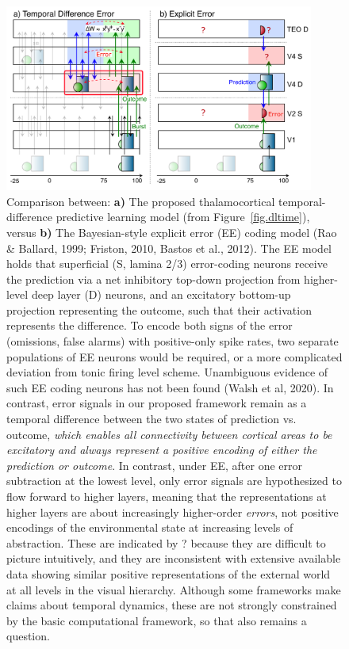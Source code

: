 \documentclass[11pt,twoside]{article}
\newif\myifpdf
\begin{document}
\begin{figure}
  \centering\includegraphics[width=4in]{fig_deepleabra_vs_expliciterr}
  \caption{\footnotesize Comparison between: {\bf a)} The proposed thalamocortical temporal-difference predictive learning model (from Figure~\ref{fig.dltime}), versus {\bf b)} The Bayesian-style explicit error (EE) coding model (Rao \& Ballard, 1999; Friston, 2010, Bastos et al., 2012).  The EE model holds that superficial (S, lamina 2/3) error-coding neurons receive the prediction via a net inhibitory top-down projection from higher-level deep layer (D) neurons, and an excitatory bottom-up projection representing the outcome, such that their activation represents the difference.  To encode both signs of the error (omissions, false alarms) with positive-only spike rates, two separate populations of EE neurons would be required, or a more complicated deviation from tonic firing level scheme.  Unambiguous evidence of such EE coding neurons has not been found (Walsh et al, 2020).  In contrast, error signals in our proposed framework remain as a temporal difference between the two states of prediction vs. outcome, \emph{which enables all connectivity between cortical areas to be excitatory and always represent a positive encoding of either the prediction or outcome}.  In contrast, under EE, after one error subtraction at the lowest level, only error signals are hypothesized to flow forward to higher layers, meaning that the representations at higher layers are about increasingly higher-order \emph{errors}, not positive encodings of the environmental state at increasing levels of abstraction.  These are indicated by ? because they are difficult to picture intuitively, and they are inconsistent with extensive available data showing similar positive representations of the external world at all levels in the visual hierarchy.  Although some frameworks make claims about temporal dynamics, these are not strongly constrained by the basic computational framework, so that also remains a question.}
  \label{fig.ee}
\end{figure}
\end{document}
